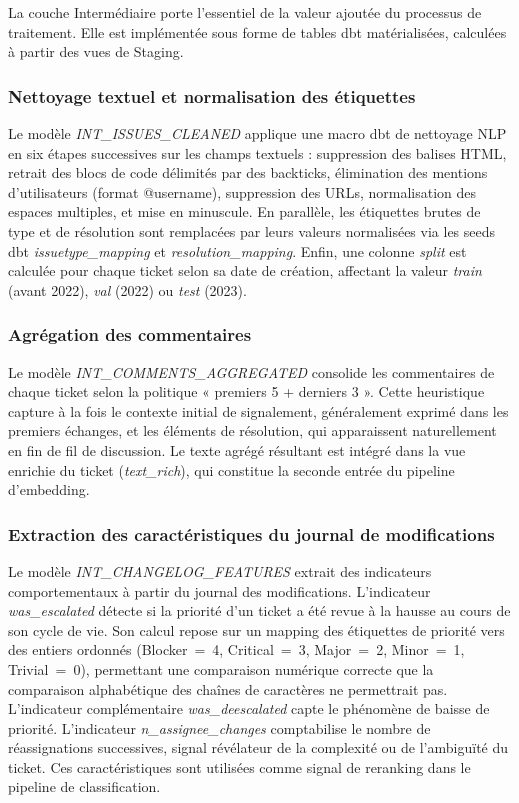 La couche Intermédiaire porte l'essentiel de la valeur ajoutée du processus de traitement. Elle est implémentée sous forme de tables dbt matérialisées, calculées à partir des vues de Staging.

\subsubsection{Nettoyage textuel et normalisation des étiquettes}

Le modèle \textit{INT\_ISSUES\_CLEANED} applique une macro dbt de nettoyage NLP en six étapes successives sur les champs textuels : suppression des balises HTML, retrait des blocs de code délimités par des backticks, élimination des mentions d'utilisateurs (format @username), suppression des URLs, normalisation des espaces multiples, et mise en minuscule. En parallèle, les étiquettes brutes de type et de résolution sont remplacées par leurs valeurs normalisées via les seeds dbt \textit{issuetype\_mapping} et \textit{resolution\_mapping}. Enfin, une colonne \textit{split} est calculée pour chaque ticket selon sa date de création, affectant la valeur \textit{train} (avant 2022), \textit{val} (2022) ou \textit{test} (2023).

\subsubsection{Agrégation des commentaires}

Le modèle \textit{INT\_COMMENTS\_AGGREGATED} consolide les commentaires de chaque ticket selon la politique « premiers 5 + derniers 3 ». Cette heuristique capture à la fois le contexte initial de signalement, généralement exprimé dans les premiers échanges, et les éléments de résolution, qui apparaissent naturellement en fin de fil de discussion. Le texte agrégé résultant est intégré dans la vue enrichie du ticket (\textit{text\_rich}), qui constitue la seconde entrée du pipeline d'embedding.

\subsubsection{Extraction des caractéristiques du journal de modifications}

Le modèle \textit{INT\_CHANGELOG\_FEATURES} extrait des indicateurs comportementaux à partir du journal des modifications. L'indicateur \textit{was\_escalated} détecte si la priorité d'un ticket a été revue à la hausse au cours de son cycle de vie. Son calcul repose sur un mapping des étiquettes de priorité vers des entiers ordonnés (Blocker~=~4, Critical~=~3, Major~=~2, Minor~=~1, Trivial~=~0), permettant une comparaison numérique correcte que la comparaison alphabétique des chaînes de caractères ne permettrait pas. L'indicateur complémentaire \textit{was\_deescalated} capte le phénomène de baisse de priorité. L'indicateur \textit{n\_assignee\_changes} comptabilise le nombre de réassignations successives, signal révélateur de la complexité ou de l'ambiguïté du ticket. Ces caractéristiques sont utilisées comme signal de reranking dans le pipeline de classification.

